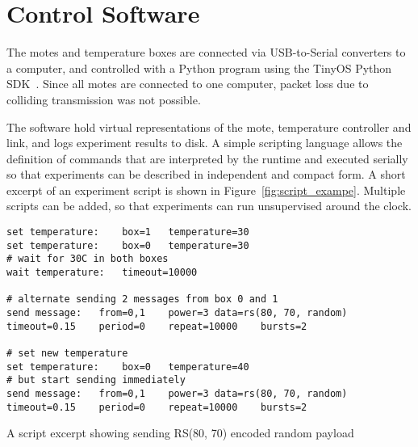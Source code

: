 \section{Control Software}

The motes and temperature boxes are connected via USB-to-Serial converters to a computer, and controlled with a Python program using the TinyOS Python SDK~\cite{tinyos.net}.
Since all motes are connected to one computer, packet loss due to colliding transmission was not possible. 

The software hold virtual representations of the mote, temperature controller and link, and logs experiment results to disk.
A simple scripting language allows the definition of commands that are interpreted by the runtime and executed serially so that experiments can be described in independent and compact form.
A short excerpt of an experiment script is shown in Figure~\ref{fig:script_exampe}.
Multiple scripts can be added, so that experiments can run unsupervised around the clock.


\begin{listing}[h]
\begin{lstlisting}[breaklines=true]
set temperature:	box=1	temperature=30
set temperature:	box=0	temperature=30
# wait for 30C in both boxes
wait temperature:	timeout=10000

# alternate sending 2 messages from box 0 and 1
send message:	from=0,1	power=3	data=rs(80, 70, random)	timeout=0.15	period=0	repeat=10000	bursts=2

# set new temperature
set temperature:	box=0	temperature=40
# but start sending immediately
send message:	from=0,1	power=3	data=rs(80, 70, random)	timeout=0.15	period=0	repeat=10000	bursts=2
\end{lstlisting}
\caption{A script excerpt showing sending RS(80, 70) encoded random payload}
\label{lst:script_example}
\end{listing}


